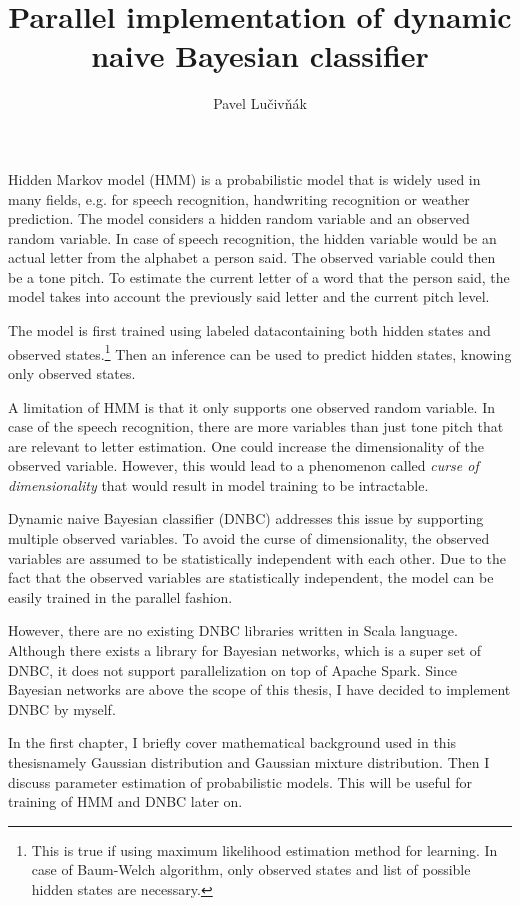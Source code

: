 \documentclass[thesis=B,english]{FITthesis}[2012/06/26]
\title{Parallel implementation of dynamic naive Bayesian classifier}
\author{Pavel Lučivňák} %
\begin{document}

\begin{introduction}
Hidden Markov model (HMM) is a probabilistic model that is widely used in many fields, e.g. for speech recognition, handwriting recognition or weather prediction. The model considers a hidden random variable and an observed random variable. In case of speech recognition, the hidden variable would be an actual letter from the alphabet a person said. The observed variable could then be a tone pitch. To estimate the current letter of a word that the person said, the model takes into account the previously said letter and the current pitch level.

The model is first trained using labeled data\textemdash containing both hidden states and observed states.\footnote{This is true if using maximum likelihood estimation method for learning. In case of Baum-Welch algorithm, only observed states and list of possible hidden states are necessary.} Then an inference can be used to predict hidden states, knowing only observed states.

A limitation of HMM is that it only supports one observed random variable. In case of the speech recognition, there are more variables than just tone pitch that are relevant to letter estimation. One could increase the dimensionality of the observed variable. However, this would lead to a phenomenon called \textit{curse of dimensionality} that would result in model training to be intractable.

Dynamic naive Bayesian classifier (DNBC) addresses this issue by supporting multiple observed variables. To avoid the curse of dimensionality, the observed variables are assumed to be statistically independent with each other. Due to the fact that the observed variables are statistically independent, the model can be easily trained in the parallel fashion.

However, there are no existing DNBC libraries written in Scala language. Although there exists a library for Bayesian networks, which is a super set of DNBC, it does not support parallelization on top of Apache Spark. Since Bayesian networks are above the scope of this thesis, I have decided to implement DNBC by myself.

In the first chapter, I briefly cover mathematical background used in this thesis\textemdash namely Gaussian distribution and Gaussian mixture distribution. Then I discuss parameter estimation of probabilistic models. This will be useful for training of HMM and DNBC later on.


\end{introduction}
\end{document}
